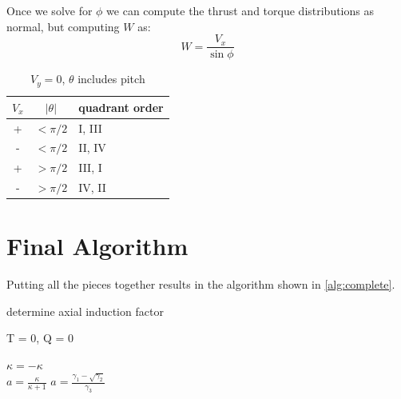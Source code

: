 \documentclass{article}
\begin{document}
Once we solve for $\phi$ we can compute the thrust and torque distributions as normal, but computing $W$ as:
\begin{equation}
    W = \frac{V_x}{\sin\phi}
\end{equation}

\begin{table}[htb]
\centering
\caption{$V_y = 0$, $\theta$ includes pitch}
\label{tab:bracket3}
\begin{tabular}{@{}ccl@{}}
\toprule
$V_x$ & $|\theta|$ & quadrant order \\
\midrule
+ & $< \pi/2$ & I, III \\
- & $< \pi/2$ & II, IV \\
+ & $> \pi/2$ & III, I \\
- & $> \pi/2$ & IV, II \\
\bottomrule
\end{tabular}
\end{table}



\section{Final Algorithm}

Putting all the pieces together results in the algorithm shown in \cref{alg:complete}.

\begin{algorithm}[htbp]
\caption{determine axial induction factor}
\begin{algorithmic}

    \State T = 0, Q = 0

    \State
\EndIf

    \State $\kappa = -\kappa$
\EndIf
\\
    \State $a = \frac{\kappa}{\kappa + 1}$
\Else
    \State $a = \frac{\gamma_1 - \sqrt{\gamma_2}}{\gamma_3}$
\EndIf

\end{algorithmic}
\label{alg:complete}
\end{algorithm}



\end{document}
